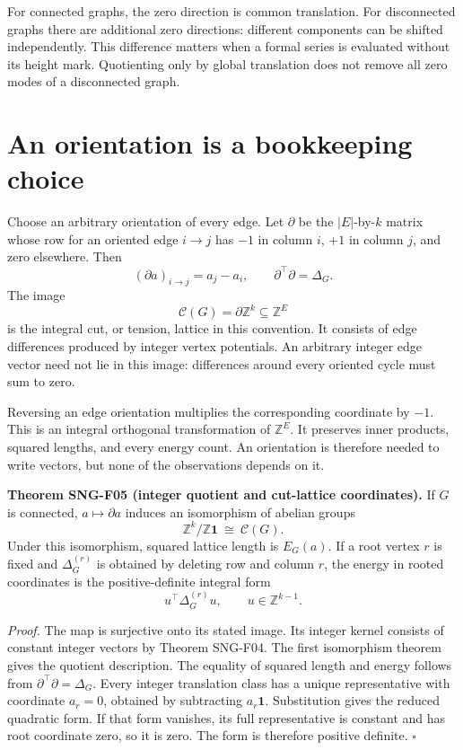 \documentclass[
  11pt,
  a4paper,
]{report}
\begin{document}
For connected graphs, the zero direction is common translation. For
disconnected graphs there are additional zero directions: different
components can be shifted independently. This difference matters when a
formal series is evaluated without its height mark. Quotienting only by
global translation does not remove all zero modes of a disconnected
graph.

\hypertarget{an-orientation-is-a-bookkeeping-choice}{%
\section{An orientation is a bookkeeping
choice}\label{an-orientation-is-a-bookkeeping-choice}}

Choose an arbitrary orientation of every edge. Let \(\partial\) be the
\(|E|\)-by-\(k\) matrix whose row for an oriented edge \(i\to j\) has
\(-1\) in column \(i\), \(+1\) in column \(j\), and zero elsewhere. Then
\[
(\partial a)_{i\to j}=a_j-a_i,
\qquad \partial^\top\partial=\Delta_G.
\] The image \[
\mathcal C(G)=\partial\mathbb Z^k\subseteq\mathbb Z^E
\] is the integral cut, or tension, lattice in this convention. It
consists of edge differences produced by integer vertex potentials. An
arbitrary integer edge vector need not lie in this image: differences
around every oriented cycle must sum to zero.

Reversing an edge orientation multiplies the corresponding coordinate by
\(-1\). This is an integral orthogonal transformation of
\(\mathbb Z^E\). It preserves inner products, squared lengths, and every
energy count. An orientation is therefore needed to write vectors, but
none of the observations depends on it.

\textbf{Theorem SNG-F05 (integer quotient and cut-lattice coordinates).}
If \(G\) is connected, \(a\mapsto\partial a\) induces an isomorphism of
abelian groups \[
\mathbb Z^k/\mathbb Z\mathbf1\ \cong\ \mathcal C(G).
\] Under this isomorphism, squared lattice length is \(E_G(a)\). If a
root vertex \(r\) is fixed and \(\Delta_G^{(r)}\) is obtained by
deleting row and column \(r\), the energy in rooted coordinates is the
positive-definite integral form \[
u^\top\Delta_G^{(r)}u,\qquad u\in\mathbb Z^{k-1}.
\]

\emph{Proof.} The map is surjective onto its stated image. Its integer
kernel consists of constant integer vectors by Theorem SNG-F04. The
first isomorphism theorem gives the quotient description. The equality
of squared length and energy follows from
\(\partial^\top\partial=\Delta_G\). Every integer translation class has
a unique representative with coordinate \(a_r=0\), obtained by
subtracting \(a_r\mathbf1\). Substitution gives the reduced quadratic
form. If that form vanishes, its full representative is constant and has
root coordinate zero, so it is zero. The form is therefore positive
definite. \(\square\)
\end{document}
